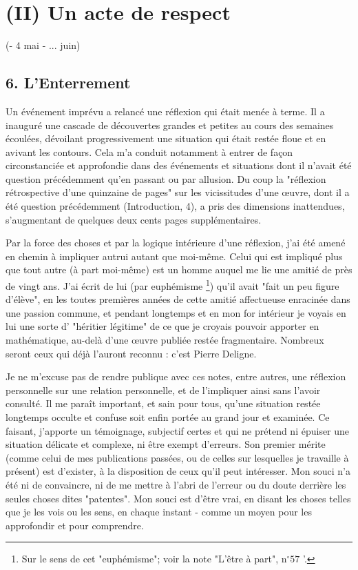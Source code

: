 \section*{(II) Un acte de respect}

(- 4 mai - ... juin)

\subsection{6. L'Enterrement}

Un événement imprévu a relancé une réflexion qui était menée à terme. Il a inauguré une cascade de découvertes grandes et petites au cours des semaines écoulées, dévoilant progressivement une situation qui était restée floue et en avivant les contours. Cela m'a conduit notamment à entrer de façon circonstanciée et approfondie dans des événements et situations dont il n'avait été question précédemment qu'en passant ou par allusion. Du coup la "réflexion rétrospective d'une quinzaine de pages" sur les vicissitudes d'une œuvre, dont il a été question précédemment (Introduction, 4), a pris des dimensions inattendues, s'augmentant de quelques deux cents pages supplémentaires.

Par la force des choses et par la logique intérieure d'une réflexion, j'ai été amené en chemin à impliquer autrui autant que moi-même. Celui qui est impliqué plus que tout autre (à part moi-même) est un homme auquel me lie une amitié de près de vingt ans. J'ai écrit de lui (par euphémisme \footnote{Sur le sens de cet "euphémisme"; voir la note "L'être à part", $\mathrm{n}^{\circ} 57$ '.}) qu'il avait "fait un peu figure d'élève", en les toutes premières années de cette amitié affectueuse enracinée dans une passion commune, et pendant longtemps et en mon for intérieur je voyais en lui une sorte d' "héritier légitime" de ce que je croyais pouvoir apporter en mathématique, au-delà d'une œuvre publiée restée fragmentaire. Nombreux seront ceux qui déjà l'auront reconnu : c'est Pierre Deligne.

Je ne m'excuse pas de rendre publique avec ces notes, entre autres, une réflexion personnelle sur une relation personnelle, et de l'impliquer ainsi sans l'avoir consulté. Il me paraît important, et sain pour tous, qu'une situation restée longtemps occulte et confuse soit enfin portée au grand jour et examinée. Ce faisant, j'apporte un témoignage, subjectif certes et qui ne prétend ni épuiser une situation délicate et complexe, ni être exempt d'erreurs. Son premier mérite (comme celui de mes publications passées, ou de celles sur lesquelles je travaille à présent) est d'exister, à la disposition de ceux qu'il peut intéresser. Mon souci n'a été ni de convaincre, ni de me mettre à l'abri de l'erreur ou du doute derrière les seules choses dites "patentes". Mon souci est d'être vrai, en disant les choses telles que je les vois ou les sens, en chaque instant - comme un moyen pour les approfondir et pour comprendre.

